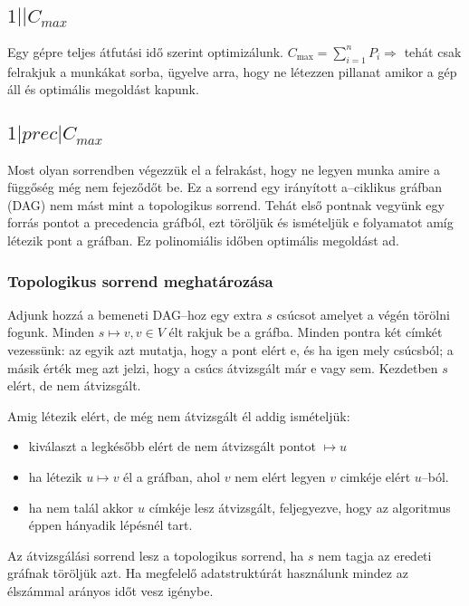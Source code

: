 \subsection{ \texorpdfstring {$ 1||C_{max} $} {1||Cmax} }

Egy gépre teljes átfutási idő szerint optimizálunk. $C_{\mbox{max}}=\sum_{i=1}^{n}
P_i \Rightarrow$ tehát csak felrakjuk a munkákat sorba, ügyelve arra, hogy ne 
létezzen pillanat amikor a gép áll és optimális megoldást kapunk.

\subsection{ \texorpdfstring {$ 1|prec|C_{max} $} {1|prec|Cmax} }

Most olyan sorrendben végezzük el a felrakást, hogy ne legyen munka amire a
függőség még nem fejeződőt be. Ez a sorrend egy irányított a--ciklikus gráfban
(DAG) nem mást mint a topologikus sorrend. Tehát első pontnak vegyünk egy forrás
pontot a precedencia gráfból, ezt töröljük és ismételjük e folyamatot amíg
létezik pont a gráfban. Ez polinomiális időben optimális megoldást ad.

\subsubsection{Topologikus sorrend meghatározása}

Adjunk hozzá a bemeneti DAG--hoz egy extra $s$ csúcsot amelyet a végén törölni
fogunk. Minden $s \mapsto v, v \in V$ élt rakjuk be a gráfba. Minden pontra két
címkét vezessünk: az egyik azt mutatja, hogy a pont elért e, és ha igen mely
csúcsból; a másik érték meg azt jelzi, hogy a csúcs átvizsgált már e vagy sem.
Kezdetben $s$ elért, de nem átvizsgált.

Amig létezik elért, de még nem átvizsgált él addig ismételjük: 

\begin{itemize}
  \item kiválaszt a legkésőbb elért de nem átvizsgált pontot $\mapsto u$
  \item ha létezik $u \mapsto v$ él a gráfban, ahol $v$ nem elért legyen $v$
  cimkéje elért $u$--ból.
  \item ha nem talál akkor $u$ címkéje lesz átvizsgált, feljegyezve, hogy az 
  algoritmus éppen hányadik lépésnél tart.
\end{itemize}

Az átvizsgálási sorrend lesz a topologikus sorrend, ha $s$ nem tagja az eredeti
gráfnak töröljük azt. Ha megfelelő adatstruktúrát használunk mindez az élszámmal
arányos időt vesz igénybe.

